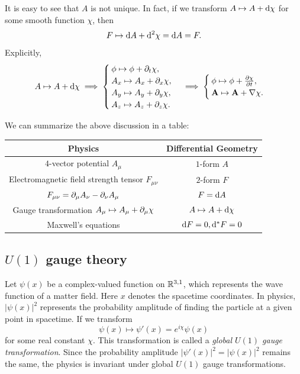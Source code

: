 It is easy to see that $A$ is not unique. In fact, 
if we transform $A\mapsto A + {\rm d}\chi$ for some smooth function $\chi$, then 
\begin{equation*}
    F \mapsto {\rm d} A + {\rm d}^2 \chi = {\rm d} A = F.
\end{equation*}
Explicitly,
\begin{equation*}
    A \mapsto A + {\rm d}\chi \implies
    \begin{cases}
        \phi \mapsto \phi + \partial_t \chi, \\
        A_x \mapsto A_x + \partial_x \chi, \\
        A_y \mapsto A_y + \partial_y \chi, \\
        A_z \mapsto A_z + \partial_z \chi.
    \end{cases}\implies
    \begin{cases}
        \phi \mapsto \phi + \frac{\partial \chi}{\partial t}, \\
        \mathbf{A} \mapsto \mathbf{A} + \nabla \chi.
    \end{cases}
\end{equation*}

We can summarize the above discussion in a table: 
\begin{center}
    \begin{tabular}{|c|c|}
        \hline
        \textbf{Physics} & \textbf{Differential Geometry} \\
        \hline
        $4$-vector potential $A_\mu$ & $1$-form $A$ \\
        \hline
        Electromagnetic field strength tensor $F_{\mu\nu}$ & $2$-form $F$ \\
        \hline
        $F_{\mu\nu}=\partial_\mu A_\nu - \partial_\nu A_\mu$ & $F = {\rm d} A$ \\
        \hline
        Gauge transformation $A_\mu \mapsto A_\mu + \partial_\mu \chi$ & $A \mapsto A + {\rm d}\chi$ \\
        \hline
        Maxwell's equations & ${\rm d} F = 0, {\rm d}^* F = 0$ \\
        \hline
    \end{tabular}
\end{center}

\subsection{$U(1)$ gauge theory}
Let $\psi(x)$ be a complex-valued function on $\mathbb{R}^{3,1}$, which represents the wave function of a matter field.
Here $x$ denotes the spacetime coordinates. 
In physics, $|\psi(x)|^2$ represents the probability amplitude of finding the particle at a given point in spacetime. 
If we transform 
\begin{equation*}
    \psi(x) \mapsto \psi'(x)=e^{i\chi}\psi(x)
\end{equation*}
for some real constant $\chi$. This transformation is called a \textit{global $U(1)$ gauge transformation}. 
Since the probability amplitude $|\psi'(x)|^2=|\psi(x)|^2$ remains the same, 
the physics is invariant under global $U(1)$ gauge transformations.

